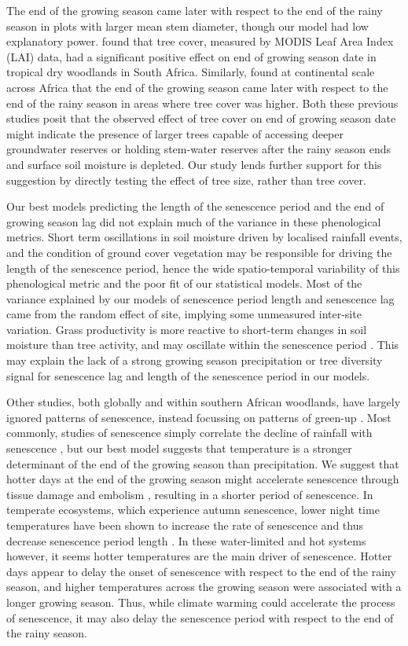 \documentclass[11pt,a4paper]{article}
\begin{document}
The end of the growing season came later with respect to the end of the rainy
season in plots with larger mean stem diameter, though our model had low
explanatory power. \citet{Cho2017} found that tree cover, measured by MODIS
Leaf Area Index (LAI) data, had a significant positive effect on end of growing
season date in tropical dry woodlands in South Africa. Similarly,
\citet{Guan2014} found at continental scale across Africa that the end of the
growing season came later with respect to the end of the rainy season in areas
where tree cover was higher. Both these previous studies posit that the
observed effect of tree cover on end of growing season date might indicate the
presence of larger trees capable of accessing deeper groundwater reserves or
holding stem-water reserves after the rainy season ends and surface soil
moisture is depleted. Our study lends further support for this suggestion by
directly testing the effect of tree size, rather than tree cover. 

Our best models predicting the length of the senescence period and the end of
growing season lag did not explain much of the variance in these phenological
metrics. Short term oscillations in soil moisture driven by localised rainfall
events, and the condition of ground cover vegetation may be responsible for
driving the length of the senescence period, hence the wide spatio-temporal
variability of this phenological metric and the poor fit of our statistical
models. Most of the variance explained by our models of senescence period
length and senescence lag came from the random effect of site, implying some
unmeasured inter-site variation. Grass productivity is more reactive to
short-term changes in soil moisture than tree activity, and may oscillate
within the senescence period \citep{Archibald2007}. This may explain the lack
of a strong growing season precipitation or tree diversity signal for
senescence lag and length of the senescence period in our models.

Other studies, both globally and within southern African woodlands, have
largely ignored patterns of senescence, instead focussing on patterns of
green-up \citep{Gallinat2015}. Most commonly, studies of senescence simply
correlate the decline of rainfall with senescence \citep{Stevens2016,
Guan2014}, but our best model suggests that temperature is a stronger
determinant of the end of the growing season than precipitation. We suggest
that hotter days at the end of the growing season might accelerate senescence
through tissue damage and embolism \citep{Cho2017}, resulting in a shorter
period of senescence. In temperate ecosystems, which experience autumn
senescence, lower night time temperatures have been shown to increase the rate
of senescence and thus decrease senescence period length \citep{Michelson2017,
Escamilla2020}. In these water-limited and hot systems however, it seems hotter
temperatures are the main driver of senescence. Hotter days appear to delay the
onset of senescence with respect to the end of the rainy season, and higher
temperatures across the growing season were associated with a longer growing
season. Thus, while climate warming could accelerate the process of senescence,
it may also delay the senescence period with respect to the end of the rainy
season.
\end{document}
